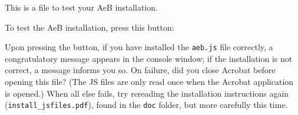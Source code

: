 \documentclass{article}
\begin{document}
This is a file to test your \textsf{AeB} installation.

To test the \textsf{AeB} installation, press this button:

Upon pressing the button, if you have installed the \texttt{aeb.js} file
correctly, a congratulatory message appears in the console window; if the
installation is not correct, a message informs you so. On failure, did you
close \textsf{Acrobat} before opening this file? (The JS files are only read
once when the \textsf{Acrobat} application is opened.) When all else fails,
try rereading the installation instructions again
(\texttt{install\_jsfiles.pdf}), found in the \texttt{doc} folder, but more
carefully this time.
\end{document}
